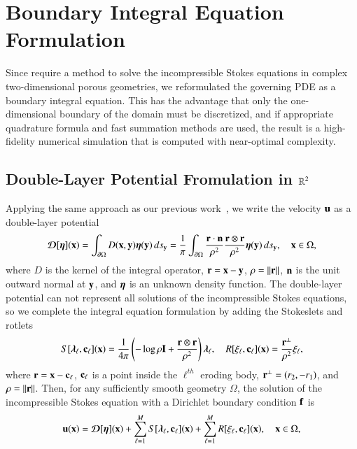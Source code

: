 \documentclass[preprint,10pt]{elsarticle}
\begin{document}
\section{Boundary Integral Equation Formulation}
\label{sec:DLP}
Since require a method to solve the incompressible Stokes equations in
complex two-dimensional porous geometries, we reformulated the governing
PDE as a boundary integral equation. This has the advantage that only
the one-dimensional boundary of the domain must be discretized, and if
appropriate quadrature formula and fast summation methods are used, the
result is a high-fidelity numerical simulation that is computed with
near-optimal complexity.

\subsection{Double-Layer Potential Fromulation in ${\mathbb{R}}^2$}
Applying the same approach as our previous work~\cite{qua-moo2018}, we
write the velocity ${\mathbf{u}}$ as a double-layer potential 
\begin{align}
  {\boldsymbol{\mathcal D}}[{\boldsymbol\eta}]({\mathbf{x}}) = \int_{{\partial}\Omega} D({\mathbf{x}},{\mathbf{y}}) {\boldsymbol\eta}({\mathbf{y}})\, ds_{\mathbf{y}} = 
  \frac{1}{\pi}\int_{{\partial}\Omega} 
    \frac{{\mathbf{r}} \cdot {\mathbf{n}}}{\rho^2} \frac{{\mathbf{r}} \otimes {\mathbf{r}}}{\rho^2}
    {\boldsymbol\eta}({\mathbf{y}}) \, ds_{\mathbf{y}}, \quad {\mathbf{x}} \in \Omega,
  \label{eqn:velocityDLP}
\end{align}
where $D$ is the kernel of the integral operator, ${\mathbf{r}} = {\mathbf{x}} - {\mathbf{y}}$,
$\rho = \|{\mathbf{r}}\|$, ${\mathbf{n}}$ is the unit outward normal at ${\mathbf{y}}$, and ${\boldsymbol\eta}$
is an unknown density function.  The double-layer potential can not
represent all solutions of the incompressible Stokes equations, so we
complete the integral equation formulation by adding the Stokeslets and
rotlets~\cite{pow-mir1987}
\begin{align}
  S[{\boldsymbol\lambda}_\ell,{\mathbf{c}}_\ell]({\mathbf{x}}) = \frac{1}{4\pi} \left( 
    -\log \rho {\mathbf{I}} + \frac{{\mathbf{r}} \otimes {\mathbf{r}}}{\rho^2}
    \right){\boldsymbol\lambda}_\ell, \quad
  R[\xi_\ell,{\mathbf{c}}_\ell]({\mathbf{x}}) = \frac{{\mathbf{r}}^\perp}{\rho^2} \xi_\ell,
\end{align}
where ${\mathbf{r}} = {\mathbf{x}} - {\mathbf{c}}_\ell$, ${\mathbf{c}}_\ell$ is a point inside the
$\ell^{th}$ eroding body, ${\mathbf{r}}^\perp = (r_2,-r_1)$, and $\rho =
\|{\mathbf{r}}\|$.  Then, for any sufficiently smooth geometry $\Omega$, the
solution of the incompressible Stokes equation with a Dirichlet boundary
condition ${\mathbf{f}}$ is
\begin{align}
  {\mathbf{u}}({\mathbf{x}}) = {\boldsymbol{\mathcal D}}[{\boldsymbol\eta}]({\mathbf{x}}) + 
    \sum_{\ell=1}^M S[{\boldsymbol\lambda}_\ell,{\mathbf{c}}_\ell]({\mathbf{x}}) + 
    \sum_{\ell=1}^M R[\xi_\ell,{\mathbf{c}}_\ell]({\mathbf{x}}), \quad {\mathbf{x}} \in \Omega,
\end{align}
\end{document}
